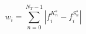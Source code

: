 \begin{equation}
w_i = \sum_{n=0}^{N_T-1} |f_i^{K_n^s} - f_i^{S_n^s}|
\label{eq:weight_optimisation_new}
\end{equation}

